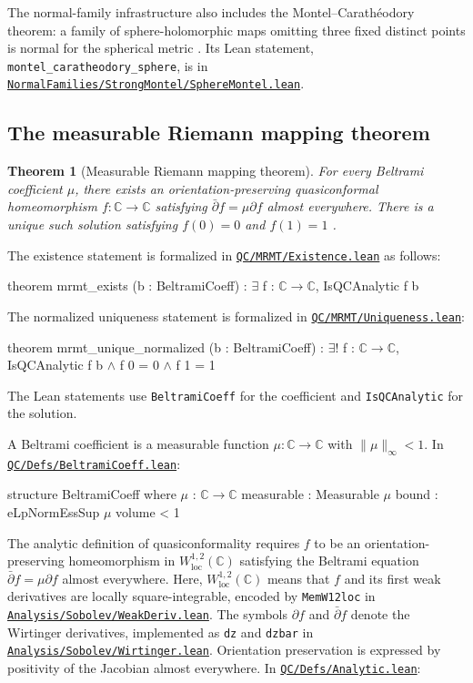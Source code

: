 \documentclass[letterpaper]{amsart}
\numberwithin{equation}{section}
\numberwithin{figure}{section}
\theoremstyle{plain}
\newtheorem{theorem}{Theorem}[section]
\theoremstyle{definition}
\newcommand{\C}{\mathbb{C}}
\newcommand{\loc}{\mathrm{loc}}
\let\lean\nolinkurl
\newcommand{\leanfile}[1]{\href{https://github.com/will1491/no-wandering-domains/blob/1a39faf/NoWanderingDomains/#1}{\lean{#1}}}
\begin{document}
The normal-family infrastructure also includes the Montel--Carath\'eodory theorem: a family of sphere-holomorphic maps omitting three fixed distinct points is normal for the spherical metric \cite{MontelCaratheodory}. Its Lean statement, \lean{montel_caratheodory_sphere}, is in \leanfile{NormalFamilies/StrongMontel/SphereMontel.lean}.

\subsection{The measurable Riemann mapping theorem}

\begin{theorem}[Measurable Riemann mapping theorem]
For every Beltrami coefficient $\mu$, there exists an orientation-preserving quasiconformal homeomorphism $f\colon\C\to\C$ satisfying $\bar\partial f=\mu\partial f$ almost everywhere. There is a unique such solution satisfying $f(0)=0$ and $f(1)=1$ \cite{AhlforsBers}.
\end{theorem}

The existence statement is formalized in \leanfile{QC/MRMT/Existence.lean} as follows:

\begin{leancode}
theorem mrmt_exists (b : BeltramiCoeff) :
  $\exists$ f : $\C \to \C$, IsQCAnalytic f b
\end{leancode}

The normalized uniqueness statement is formalized in \leanfile{QC/MRMT/Uniqueness.lean}:

\begin{leancode}
theorem mrmt_unique_normalized (b : BeltramiCoeff) :
  $\exists!$ f : $\C \to \C$,
    IsQCAnalytic f b $\land$ f 0 = 0 $\land$ f 1 = 1
\end{leancode}

The Lean statements use \lean{BeltramiCoeff} for the coefficient and \lean{IsQCAnalytic} for the solution.

A Beltrami coefficient is a measurable function $\mu\colon\C\to\C$ with $\|\mu\|_{\infty}<1$. In \leanfile{QC/Defs/BeltramiCoeff.lean}:

\begin{leancode}
structure BeltramiCoeff where
  $\mu$ : $\C \to \C$
  measurable : Measurable $\mu$
  bound : eLpNormEssSup $\mu$ volume < 1
\end{leancode}

The analytic definition of quasiconformality requires $f$ to be an orientation-preserving homeomorphism in $W^{1,2}_{\loc}(\C)$ satisfying the Beltrami equation $\bar\partial f=\mu\partial f$ almost everywhere. Here, $W^{1,2}_{\loc}(\C)$ means that $f$ and its first weak derivatives are locally square-integrable, encoded by \lean{MemW12loc} in \leanfile{Analysis/Sobolev/WeakDeriv.lean}. The symbols $\partial f$ and $\bar\partial f$ denote the Wirtinger derivatives, implemented as \lean{dz} and \lean{dzbar} in \leanfile{Analysis/Sobolev/Wirtinger.lean}. Orientation preservation is expressed by positivity of the Jacobian almost everywhere. In \leanfile{QC/Defs/Analytic.lean}:
\end{document}
